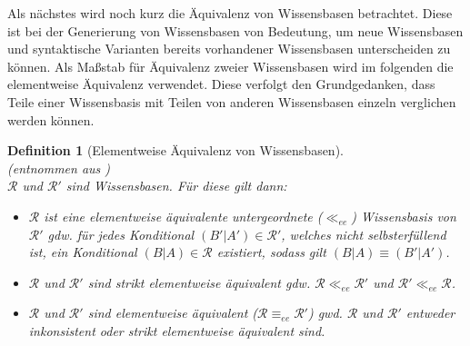 \documentclass[12pt,a4paper]{article}
\newtheorem{theorem}{Definition}
\begin{document}
Als nächstes wird noch kurz die Äquivalenz von Wissensbasen betrachtet. Diese ist bei der Generierung von Wissensbasen von Bedeutung, um neue Wissensbasen und syntaktische Varianten bereits vorhandener Wissensbasen unterscheiden zu können. Als Maßstab für Äquivalenz zweier Wissensbasen wird im folgenden die elementweise Äquivalenz verwendet. Diese verfolgt den Grundgedanken, dass Teile einer Wissensbasis mit Teilen von anderen Wissensbasen einzeln verglichen werden können.
\begin{theorem}[Elementweise Äquivalenz von Wissensbasen] \ \\(entnommen aus \cite{beierle17b}) \ \\
$\mathcal{R}$ und $\mathcal{R'}$ sind Wissensbasen. Für diese gilt dann:
\begin{itemize}
\item{$\mathcal{R}$ ist eine elementweise äquivalente untergeordnete ($\ll_{ee}$) Wissensbasis von $\mathcal{R'}$ gdw. für jedes Konditional $(B'|A') \in \mathcal{R'}$, welches nicht selbsterfüllend ist, ein Konditional $(B|A) \in \mathcal{R}$ existiert, sodass gilt $(B|A) \equiv (B'|A')$.}
\item{$\mathcal{R}$ und $\mathcal{R'}$ sind strikt elementweise äquivalent gdw. $\mathcal{R} \ll_{ee} \mathcal{R'}$ und $\mathcal{R}' \ll_{ee}\mathcal{R}$.}
\item{$\mathcal{R}$ und $\mathcal{R'}$ sind elementweise äquivalent ($\mathcal{R} \equiv_{ee} \mathcal{R'}$) gwd. $\mathcal{R}$ und $\mathcal{R'}$ entweder inkonsistent oder strikt elementweise äquivalent sind.}
\end{itemize}
\end{theorem}
\end{document}
